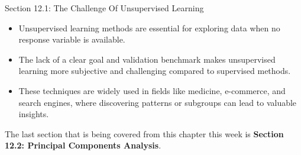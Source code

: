 \begin{notes}{Section 12.1: The Challenge Of Unsupervised Learning}
    \begin{highlight}
        \begin{itemize}
            \item Unsupervised learning methods are essential for exploring data when no response variable is available.
            \item The lack of a clear goal and validation benchmark makes unsupervised learning more subjective and challenging compared to supervised methods.
            \item These techniques are widely used in fields like medicine, e-commerce, and search engines, where discovering patterns or subgroups can lead to valuable insights.
        \end{itemize}
    \end{highlight}
\end{notes}

The last section that is being covered from this chapter this week is \textbf{Section 12.2: Principal Components Analysis}.


